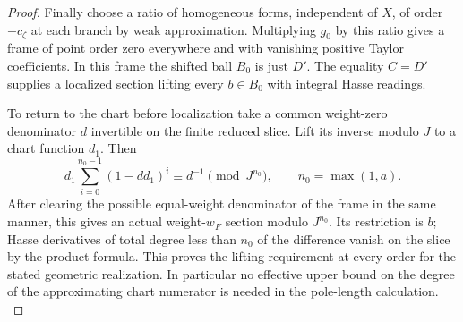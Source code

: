 \begin{proof}
Finally choose a ratio of homogeneous forms, independent
of \(X\), of order \(-c_\zeta\) at each branch by weak
approximation. Multiplying \(g_0\) by this ratio gives a
frame of point order zero everywhere and with vanishing
positive Taylor coefficients. In this frame the shifted ball
\(B_0\) is just \(D'\). The equality \(C=D'\) supplies a
localized section lifting every \(b\in B_0\) with integral
Hasse readings.

To return to the chart before localization
take a common weight-zero denominator \(d\) invertible on
the finite reduced slice. Lift its inverse modulo \(J\) to
a chart function \(d_1\). Then
\[
                 d_1\sum_{i=0}^{n_0-1}(1-dd_1)^i
              \equiv d^{-1}\pmod {J^{n_0}},\qquad
                 n_0=\max(1,a).
\]
After clearing the possible equal-weight denominator of the
frame in the same manner, this gives an actual weight-\(w_F\)
section modulo \(J^{n_0}\). Its restriction is \(b\); Hasse
derivatives of total degree less than \(n_0\) of the difference
vanish on the slice by the product formula. This proves the
lifting requirement at every order for the stated geometric
realization. In particular no effective upper bound on the
degree of the approximating chart numerator is needed in
the pole-length calculation. \label{cor:generic-slice-lifting-2}
\end{proof}
